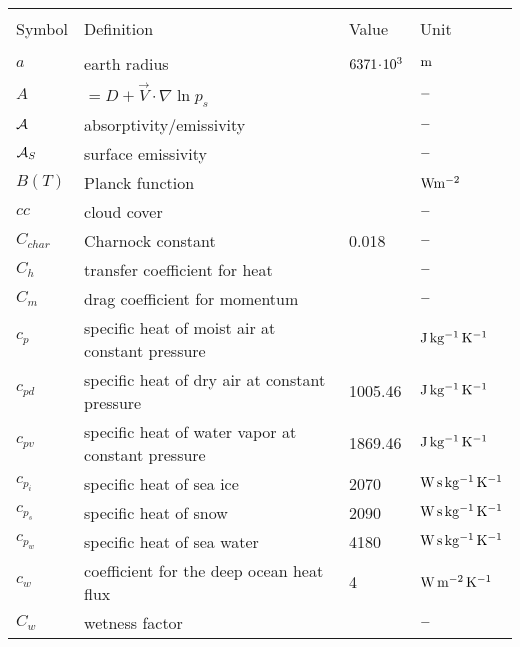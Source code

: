 \label{locs}
\begin{tabular*}{\textwidth}{|l@{\extracolsep\fill}lll|}
\hline
\vspace{-3mm} & & & \\
Symbol         & Definition                       & Value   & Unit \\
\hline 
\vspace{-3mm} & & & \\
$a$       & earth radius                          & $\rm 6371\! \cdot \! 10^{3}$ & $\rm
m$ \\
$A$       & $=D+\vec{V} \cdot \nabla \ln p_s $         &         & $\rm -$ \\
${\cal A}$      &  absorptivity/emissivity                                           &                     & $\rm -$ \\
${\cal A}_S$  & surface emissivity                                              &         &$\rm -$ \\
$B(T)$            & Planck function                    &    &$\rm Wm^{-2}$ \\
$cc$      & cloud cover                 &    & $\rm -$\\
$C_{char}$     & Charnock constant                     & 0.018   & $\rm -$ \\
$C_h$          & transfer coefficient for heat         &         & $\rm -$ \\
$C_m$          & drag coefficient for momentum         &         & $\rm -$ \\
$c_p$          & specific heat of moist air at constant pressure      &         & $\rm J\,
kg^{-1}\, K^{-1}$ \\  
$c_{pd}$  & specific heat of dry air at constant pressure   & 1005.46      & $\rm J\,
kg^{-1}\, K^{-1}$ \\
$c_{pv}$  & specific heat of water vapor at constant pressure    & 1869.46      & $\rm J\,
kg^{-1}\, K^{-1}$ \\
$c_{p_i}$      & specific heat of sea ice              & 2070         & $\rm W\,
s\, kg^{-1}\, K^{-1}$ \\
$c_{p_s}$      & specific heat of snow            & 2090         & $\rm W\,
s\, kg^{-1}\, K^{-1}$ \\
$c_{p_w}$      & specific heat of sea water            & 4180         & $\rm W\,
s\, kg^{-1}\, K^{-1}$ \\
$c_w$          & coefficient for the deep ocean heat flux   & 4       & $\rm W\,
m^{-2}\, K^{-1}$ \\
$C_w$          & wetness factor                   &         & $\rm -$ \\


\end{tabular*}
